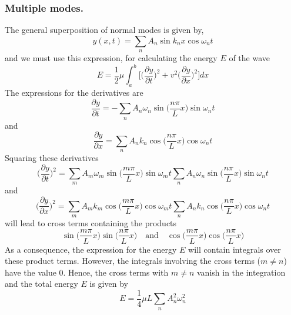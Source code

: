 \documentclass[../../../main.tex]{subfiles}
\begin{document}
\subsubsection{Multiple modes.} The general superposition of normal modes is given by,
\begin{equation*}
    y (x, t) =\sum_{n} A_n \sin k_nx \cos \omega_nt
\end{equation*}
and we must use this expression, for calculating the energy $E$ of the wave 
\begin{equation*}
    E=\frac{1}{2}\mu\int_{a}^{b}\biggl[ \biggl(\frac{\partial y}{\partial t}\biggr)^2 + v^2 \biggl(\frac{\partial y}{\partial x}\biggr)^2\biggr]dx
\end{equation*}
The expressions for the derivatives are 
\begin{equation*}
    \frac{\partial y}{\partial t}=-\sum_n A_n \omega_n \sin \biggl(\frac{n\pi }{L}x\biggr) \sin\omega_n t
\end{equation*}
and 
\begin{equation*}
    \frac{\partial y}{\partial x}=\sum_n A_n k_n \cos \biggl(\frac{n\pi }{L}x\biggr) \cos\omega_n t
\end{equation*}
Squaring these derivatives
\begin{equation*}
    \biggl(\frac{\partial y}{\partial t}\biggr)^2= \sum_m A_m \omega_m \sin \biggl(\frac{m\pi }{L}x\biggr) \sin\omega_m t\sum_n A_n \omega_n \sin \biggl(\frac{n\pi }{L}x\biggr) \sin\omega_n t
\end{equation*}
and
\begin{equation*}
    \biggl(\frac{\partial y}{\partial x}\biggr)^2=\sum_m A_m k_m \cos \biggl(\frac{m\pi }{L}x\biggr) \cos\omega_m t\sum_n A_n k_n \cos \biggl(\frac{n\pi }{L}x\biggr) \cos\omega_n t
\end{equation*}
will lead to cross terms containing the products
\begin{equation*}
    \sin \biggl(\frac{m\pi }{L}x\biggr)\sin \biggl(\frac{n\pi }{L}x\biggr)\quad\text{and}\quad \cos \biggl(\frac{m\pi }{L}x\biggr)\cos \biggl(\frac{n\pi }{L}x\biggr)
\end{equation*}
As a consequence, the expression for the energy $E$ will contain integrals over these product terms. However, the integrals involving the cross terms ($m\neq n$) have the value 0. Hence, the cross terms with $m  \neq n$ vanish in the integration and the total energy $E$ is given by 
\begin{equation*}
    E=\frac{1}{4}\mu L\sum_n A_n^2\omega_n^2
\end{equation*}
\end{document}
